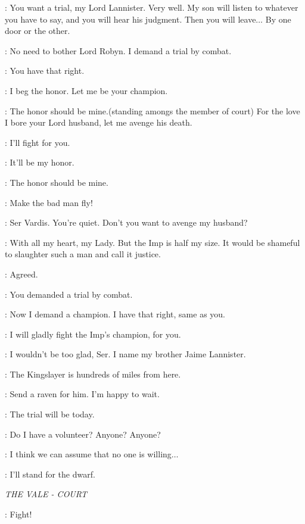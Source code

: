\LYSA:  You want a trial, my Lord Lannister. Very well. My son will listen to whatever you have to say, and you will hear his judgment. Then you will leave$\ldots$ By one door or the other. 

\TYRION:  No need to bother Lord Robyn. I demand a trial by combat. 

\LYSA:  You have that right. 

\KNIGHTa:  I beg the honor. Let me be your champion. 

\KNIGHTb: The honor should be mine.(standing amongs the member of court) For the love I bore your Lord husband, let me avenge his death. 

\KNIGHTc:  I'll fight for you. 

\KNIGHTd:  It'll be my honor. 

\KNIGHTe:  The honor should be mine. 

\ROBYN:  Make the bad man fly! 

\LYSA: Ser Vardis. You're quiet. Don't you want to avenge my husband? 

\VARDIS:  With all my heart, my Lady. But the Imp is half my size. It would be shameful to slaughter such a man and call it justice. 

\TYRION:  Agreed. 

\LYSA:  You demanded a trial by combat. 

\TYRION:  Now I demand a champion. I have that right, same as you. 

\VARDIS: I will gladly fight the Imp's champion, for you. 

\TYRION: I wouldn't be too glad, Ser. I name my brother Jaime Lannister. 

\LYSA:  The Kingslayer is hundreds of miles from here. 

\TYRION:  Send a raven for him. I'm happy to wait. 

\LYSA:  The trial will be today. 

\TYRION:  Do I have a volunteer? Anyone? Anyone? 

\LYSA:  I think we can assume that no one is willing$\ldots$ 

\BRONN:  I'll stand for the dwarf. 

\scene

\textit{THE VALE - COURT} 


\ROBYN: Fight!


